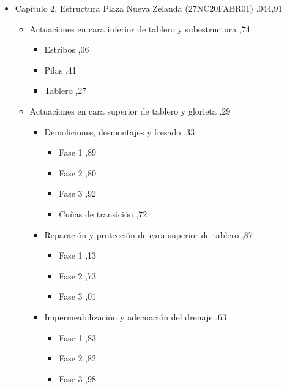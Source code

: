 \begin{itemize}
\begin{itemize}
\begin{itemize}
Protecciones colectivas%
,35%
\item%
Higiene y bienestar%
,68%
\item%
Señalización de obra%
,72%
\end{itemize}%
\end{itemize}%
\item%
Capítulo 2. Estructura Plaza Nueva Zelanda (27NC20FABR01)%
.044,91%
\begin{itemize}%
\item%
Actuaciones en cara inferior de tablero y subestructura%
,74%
\begin{itemize}%
\item%
Estribos%
,06%
\item%
Pilas%
,41%
\item%
Tablero%
,27%
\end{itemize}%
\item%
Actuaciones en cara superior de tablero y glorieta%
,29%
\begin{itemize}%
\item%
Demoliciones, desmontajes y fresado%
,33%
\begin{itemize}%
\item%
Fase 1%
,89%
\item%
Fase 2%
,80%
\item%
Fase 3%
,92%
\item%
Cuñas de transición%
,72%
\end{itemize}%
\item%
Reparación y protección de cara superior de tablero%
,87%
\begin{itemize}%
\item%
Fase 1%
,13%
\item%
Fase 2%
,73%
\item%
Fase 3%
,01%
\end{itemize}%
\item%
Impermeabilización y adecuación del drenaje%
,63%
\begin{itemize}%
\item%
Fase 1%
,83%
\item%
Fase 2%
,82%
\item%
Fase 3%
,98%
\end{itemize}%

\end{itemize}
\end{itemize}
\end{itemize}
